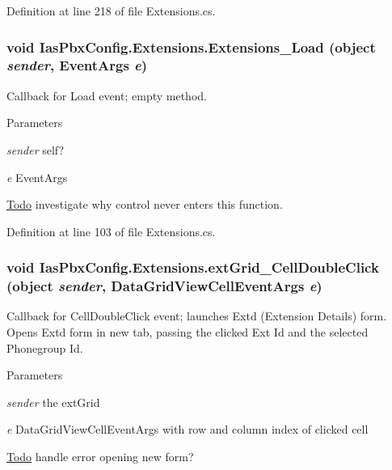 Definition at line 218 of file Extensions.cs.\hypertarget{class_ias_pbx_config_1_1_extensions_a70664e1f909e49a8d06a4975c33fb119}{
\subsubsection[{Extensions\_\-Load}]{\setlength{\rightskip}{0pt plus 5cm}void IasPbxConfig.Extensions.Extensions\_\-Load (object {\em sender}, \/  EventArgs {\em e})}}
\label{class_ias_pbx_config_1_1_extensions_a70664e1f909e49a8d06a4975c33fb119}


Callback for Load event; empty method. 
\begin{DoxyParams}{Parameters}
\item[{\em sender}]self? \item[{\em e}]EventArgs \end{DoxyParams}
\begin{Desc}
\item[\hyperlink{todo__todo000033}{Todo}]investigate why control never enters this function. \end{Desc}


Definition at line 103 of file Extensions.cs.\hypertarget{class_ias_pbx_config_1_1_extensions_a27f31a4ee57aeca9e2f19bba394a90bb}{
\subsubsection[{extGrid\_\-CellDoubleClick}]{\setlength{\rightskip}{0pt plus 5cm}void IasPbxConfig.Extensions.extGrid\_\-CellDoubleClick (object {\em sender}, \/  DataGridViewCellEventArgs {\em e})}}
\label{class_ias_pbx_config_1_1_extensions_a27f31a4ee57aeca9e2f19bba394a90bb}


Callback for CellDoubleClick event; launches Extd (Extension Details) form. Opens Extd form in new tab, passing the clicked Ext Id and the selected Phonegroup Id. 
\begin{DoxyParams}{Parameters}
\item[{\em sender}]the extGrid \item[{\em e}]DataGridViewCellEventArgs with row and column index of clicked cell \end{DoxyParams}
\begin{Desc}
\item[\hyperlink{todo__todo000036}{Todo}]handle error opening new form? \end{Desc}


